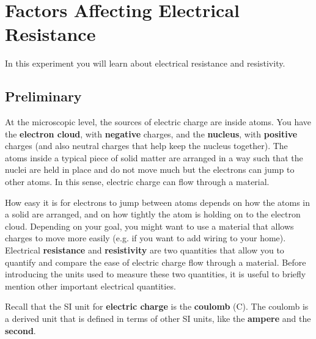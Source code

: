 \setcounter{chapter}{1}
\chapter{Factors Affecting Electrical Resistance}
%
In this experiment you will learn about electrical resistance and resistivity.
%
\section{Preliminary}
%
At the microscopic level, the sources of electric charge are inside atoms. You have the \textbf{electron cloud}, with \textbf{negative} charges, and the \textbf{nucleus}, with \textbf{positive} charges (and also neutral charges that help keep the nucleus together). The atoms inside a typical piece of solid matter are arranged in a way such that the nuclei are held in place and do not move much but the electrons can jump to other atoms. In this sense, electric charge can flow through a material.

How easy it is for electrons to jump between atoms depends on how the atoms in a solid are arranged, and on how tightly the atom is holding on to the electron cloud. Depending on your goal, you might want to use a material that allows charges to move more easily (e.g. if you want to add wiring to your home). Electrical \textbf{resistance} and \textbf{resistivity} are two quantities that allow you to quantify and compare the ease of electric charge flow through a material. Before introducing the units used to measure these two quantities, it is useful to briefly mention other important electrical quantities.

Recall that the SI unit for \textbf{electric charge} is the \textbf{coulomb} (C). The coulomb is a derived unit that is defined in terms of other SI units, like the \textbf{ampere} and the \textbf{second}.
%
